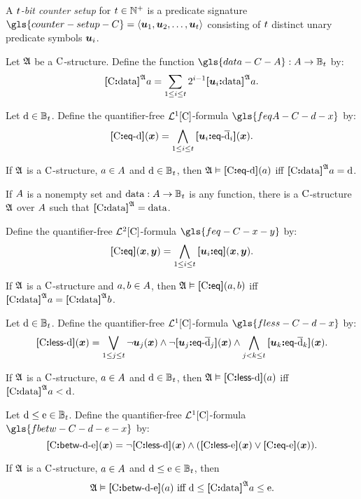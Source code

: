 A \emph{$\tbit$-bit counter setup} for $\tbit \in \pNats$ is a predicate
signature $\gls{counter-setup-C} = \seq{\suu1, \suu2, \dots, \suu\tbit}$
consisting of $\tbit$ distinct unary predicate symbols $\suu\ii$.

\begin{definition}
Let $\StrA$ be a $\CS$-structure. Define the function
$\gls{data-C-A} : \domA \to \tBitnums\tbit$ by:
\[
  \data\CS\StrA\ea = \sum_{1 \leq \ii \leq \tbit} 2^{\ii-1} 
  \data{\suu\ii}\StrA\ea.
\]
\end{definition}
\begin{definition}
Let $\datad \in \tBitnums\tbit$. Define the quantifier-free $\vFoF1\CS$-formula
$\gls{feqA-C-d-x}$ by:
\[
  \feqA\CS\datad(\xx) = \bigwedge_{1 \leq \ii \leq \tbit}
  \feqA{\suu\ii}{\benc{\datad}_\ii}(\xx).
\]
\end{definition}
If $\StrA$ is a $\CS$-structure, $\ea \in \domA$ and $\datad \in
\tBitnums\tbit$, then $\StrA \vDash \feqA\CS\datad(a)$ iff $\data\CS\StrA a =
\datad$.

If $\domA$ is a nonempty set and $\dataOP : \domA \to \tBitnums\tbit$ is any
function, there is a $\CS$-structure $\StrA$ over $\domA$ such that
$\data\CS\StrA = \dataOP$.

\begin{definition}
Define the quantifier-free $\vFoF2\CS$-formula $\gls{feq-C-x-y}$ by:
\[
  \feq\CS(\xx,\yy) = \bigwedge_{1 \leq \ii \leq \tbit} \feq{\suu\ii}(\xx,\yy).
\]
\end{definition}
If $\StrA$ is a $\CS$-structure and $\ea, \eb \in \domA$,
then $\StrA \vDash \feq\CS(\ea, \eb)$ iff $\data\CS\StrA\ea = \data\CS\StrA\eb$.

\begin{definition}
Let $\datad \in \tBitnums\tbit$.
Define the quantifier-free $\vFoF1\CS$-formula $\gls{fless-C-d-x}$ by:
\[
  \flessA\CS\datad(\xx) = \bigvee_{1 \leq \jj \leq \tbit} \lnot\suu\jj(\xx)
  \land \lnot\feqA{\suu\jj}{\benc\datad_\jj}(\xx)
    \land \bigwedge_{\jj < \kk \leq \tbit} \feqA{\suu\kk}{\benc\datad_\kk}(\xx).
\]
\end{definition}
If $\StrA$ is a $\CS$-structure, $\ea \in \domA$ and $\datad \in
\tBitnums\tbit$, then $\StrA \vDash \flessA\CS\datad(\ea)$ iff $\data\CS\StrA\ea
< \datad$.

\begin{definition}
Let $\datad \leq \datae \in \tBitnums\tbit$.
Define the quantifier-free $\vFoF1\CS$-formula $\gls{fbetw-C-d-e-x}$ by:
\[
  \fbetw\CS\datad\datae(\xx) = \lnot\flessA\CS\datad(\xx) \land 
  (\flessA\CS\datae(\xx)\lor \feqA\CS\datae(\xx)).
\]
\end{definition}
If $\StrA$ is a $\CS$-structure, $\ea \in \domA$ and $\datad \leq \datae \in
\tBitnums\tbit$, then 
\[
  \miff{
  \StrA \vDash \fbetw\CS\datad\datae(\ea)}{
  \datad \leq \data\CS\StrA\ea \leq
  \datae}.
\]

